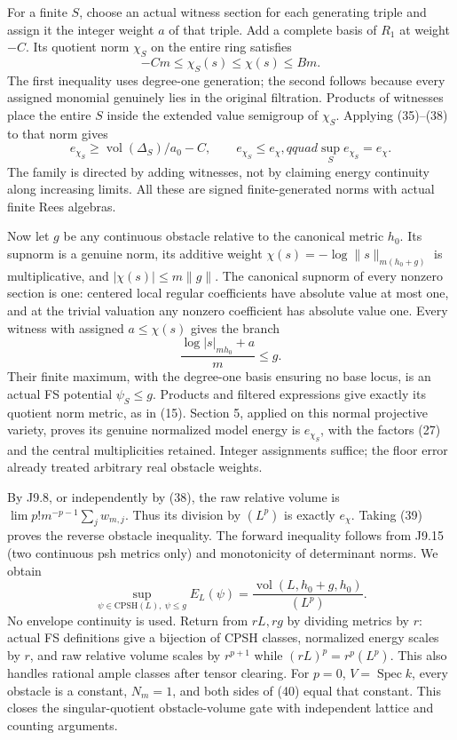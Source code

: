 \documentclass[
  10pt,
]{article}
\begin{document}
For a finite \(S\), choose an actual witness section for each generating
triple and assign it the integer weight \(a\) of that triple. Add a
complete basis of \(R_1\) at weight \(-C\). Its quotient norm \(\chi_S\)
on the entire ring satisfies \[ -Cm\leq\chi_S(s)\leq\chi(s)\leq Bm. \]
The first inequality uses degree-one generation; the second follows
because every assigned monomial genuinely lies in the original
filtration. Products of witnesses place the entire \(S\) inside the
extended value semigroup of \(\chi_S\). Applying (35)--(38) to that norm
gives
\[ e_{\chi_S}\geq\operatorname{vol}(\Delta_S)/a_0-C,\qquad e_{\chi_S}\leq e_\chi,qquad
 \sup_Se_{\chi_S}=e_\chi.                                                                     \tag{39}\]
The family is directed by adding witnesses, not by claiming energy
continuity along increasing limits. All these are signed
finite-generated norms with actual finite Rees algebras.

Now let \(g\) be any continuous obstacle relative to the canonical
metric \(h_0\). Its supnorm is a genuine norm, its additive weight
\(\chi(s)=-\log\|s\|_{m(h_0+g)}\) is multiplicative, and
\(|\chi(s)|\leq m\|g\|\). The canonical supnorm of every nonzero section
is one: centered local regular coefficients have absolute value at most
one, and at the trivial valuation any nonzero coefficient has absolute
value one. Every witness with assigned \(a\leq\chi(s)\) gives the branch
\[ \frac{\log|s|_{mh_0}+a}{m}\leq g. \] Their finite maximum, with the
degree-one basis ensuring no base locus, is an actual FS potential
\(\psi_S\leq g\). Products and filtered expressions give exactly its
quotient norm metric, as in (15). Section 5, applied on this normal
projective variety, proves its genuine normalized model energy is
\(e_{\chi_S}\), with the factors (27) and the central multiplicities
retained. Integer assignments suffice; the floor error already treated
arbitrary real obstacle weights.

By J9.8, or independently by (38), the raw relative volume is
\(\lim p!m^{-p-1}\sum_j w_{m,j}\). Thus its division by \((L^p)\) is
exactly \(e_\chi\). Taking (39) proves the reverse obstacle inequality.
The forward inequality follows from J9.15 (two continuous psh metrics
only) and monotonicity of determinant norms. We obtain
\[ \boxed{\sup_{\psi\in\mathrm{CPSH}(L),\ \psi\leq g}E_L(\psi)
       =\frac{\operatorname{vol}(L,h_0+g,h_0)}{(L^p)}.}                                      \tag{40}\]
No envelope continuity is used. Return from \(rL,rg\) by dividing
metrics by \(r\): actual FS definitions give a bijection of CPSH
classes, normalized energy scales by \(r\), and raw relative volume
scales by \(r^{p+1}\) while \((rL)^p=r^p(L^p)\). This also handles
rational ample classes after tensor clearing. For \(p=0\),
\(V=\operatorname{Spec}k\), every obstacle is a constant, \(N_m=1\), and
both sides of (40) equal that constant. This closes the
singular-quotient obstacle-volume gate with independent lattice and
counting arguments.
\end{document}
